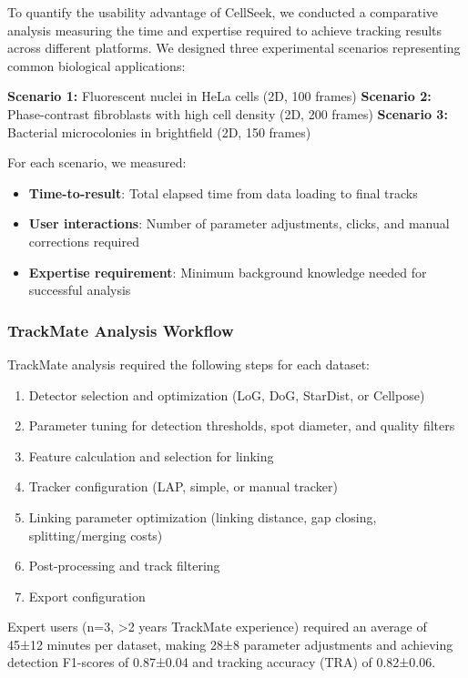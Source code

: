 \documentclass[12pt]{article}
\begin{document}
To quantify the usability advantage of CellSeek, we conducted a comparative analysis measuring the time and expertise required to achieve tracking results across different platforms. We designed three experimental scenarios representing common biological applications:

\textbf{Scenario 1:} Fluorescent nuclei in HeLa cells (2D, 100 frames)
\textbf{Scenario 2:} Phase-contrast fibroblasts with high cell density (2D, 200 frames)
\textbf{Scenario 3:} Bacterial microcolonies in brightfield (2D, 150 frames)

For each scenario, we measured:
\begin{itemize}
  \item \textbf{Time-to-result}: Total elapsed time from data loading to final tracks
  \item \textbf{User interactions}: Number of parameter adjustments, clicks, and manual corrections required
  \item \textbf{Expertise requirement}: Minimum background knowledge needed for successful analysis
\end{itemize}

\subsubsection{TrackMate Analysis Workflow}

TrackMate analysis required the following steps for each dataset:
\begin{enumerate}
  \item Detector selection and optimization (LoG, DoG, StarDist, or Cellpose)
  \item Parameter tuning for detection thresholds, spot diameter, and quality filters
  \item Feature calculation and selection for linking
  \item Tracker configuration (LAP, simple, or manual tracker)
  \item Linking parameter optimization (linking distance, gap closing, splitting/merging costs)
  \item Post-processing and track filtering
  \item Export configuration
\end{enumerate}

Expert users (n=3, >2 years TrackMate experience) required an average of 45±12 minutes per dataset, making 28±8 parameter adjustments and achieving detection F1-scores of 0.87±0.04 and tracking accuracy (TRA) of 0.82±0.06.
\end{document}
